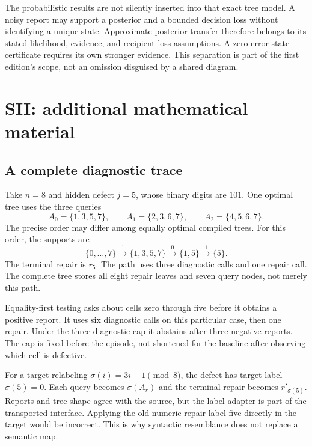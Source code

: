 \documentclass[11pt,oneside,openany]{book}
\numberwithin{equation}{section}
\begin{document}
The probabilistic results are not silently inserted into that exact tree model. A noisy report may support a posterior and a bounded decision loss without identifying a unique state. Approximate posterior transfer therefore belongs to its stated likelihood, evidence, and recipient-loss assumptions. A zero-error state certificate requires its own stronger evidence. This separation is part of the first edition's scope, not an omission disguised by a shared diagram.



\chapter{SII: additional mathematical material}
\setcounter{section}{0}

\section{A complete diagnostic trace}\label{SII:app:trace}
Take $n=8$ and hidden defect $j=5$, whose binary digits are $101$. One optimal tree uses the three queries
\[
A_0=\{1,3,5,7\},\qquad A_1=\{2,3,6,7\},\qquad A_2=\{4,5,6,7\}.
\]
The precise order may differ among equally optimal compiled trees. For this order, the supports are
\[
\{0,\ldots,7\}\xrightarrow{1}\{1,3,5,7\}
\xrightarrow{0}\{1,5\}\xrightarrow{1}\{5\}.
\]
The terminal repair is $r_5$. The path uses three diagnostic calls and one repair call. The complete tree stores all eight repair leaves and seven query nodes, not merely this path.

Equality-first testing asks about cells zero through five before it obtains a positive report. It uses six diagnostic calls on this particular case, then one repair. Under the three-diagnostic cap it abstains after three negative reports. The cap is fixed before the episode, not shortened for the baseline after observing which cell is defective.

For a target relabeling $\sigma(i)=3i+1\pmod8$, the defect has target label $\sigma(5)=0$. Each query becomes $\sigma(A_r)$ and the terminal repair becomes $r'_{\sigma(5)}$. Reports and tree shape agree with the source, but the label adapter is part of the transported interface. Applying the old numeric repair label five directly in the target would be incorrect. This is why syntactic resemblance does not replace a semantic map.
\end{document}
